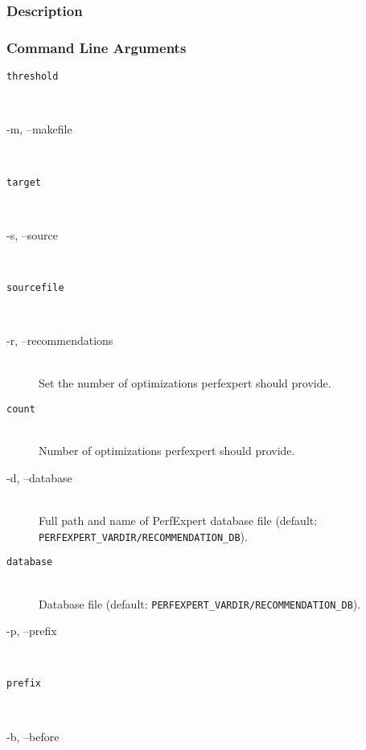 \subsubsection{Description}

\subsubsection{Command Line Arguments}


\begin{description}
	\item[\tt threshold]\hfill \\

	\item[\btt -m, --makefile]\hfill \\

	\item[\tt target]\hfill \\

	\item[\btt -s, --source]\hfill \\

	\item[\tt sourcefile]\hfill \\

	\item[\btt -r, --recommendations]\hfill \\
	Set the number of optimizations perfexpert should provide.

	\item[\tt count]\hfill \\
	Number of optimizations perfexpert should provide.

	\item[\btt -d, --database]\hfill \\
	Full path and name of PerfExpert database file (default: \texttt{PERFEXPERT\_VARDIR/RECOMMENDATION\_DB}).

	\item[\tt database]\hfill \\
	Database file (default: \texttt{PERFEXPERT\_VARDIR/RECOMMENDATION\_DB}).

	\item[\btt -p, --prefix]\hfill \\

	\item[\tt prefix]\hfill \\

	\item[\btt -b, --before]\hfill \\


\end{description}
